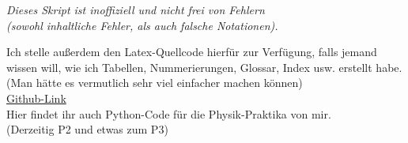 \newpage
\null\vfill
\begin{center}
	\Large\textit{
		Dieses Skript ist inoffiziell und  nicht frei von Fehlern \\
		(sowohl inhaltliche Fehler, als auch falsche Notationen).
	}
\end{center} \vspace{5cm}
\begin{center}
Ich stelle außerdem den Latex-Quellcode hierfür zur Verfügung, falls jemand wissen will, wie ich Tabellen, Nummerierungen, Glossar, Index usw. erstellt habe. \\
(Man hätte es vermutlich sehr viel einfacher machen können) \\
\href{https://github.com/Adrian-Scholand/LaTeX-Skirpts}{Github-Link} \\
Hier findet ihr auch Python-Code für die Physik-Praktika von mir. \\
(Derzeitig P2 und etwas zum P3)
\end{center}
\vfill